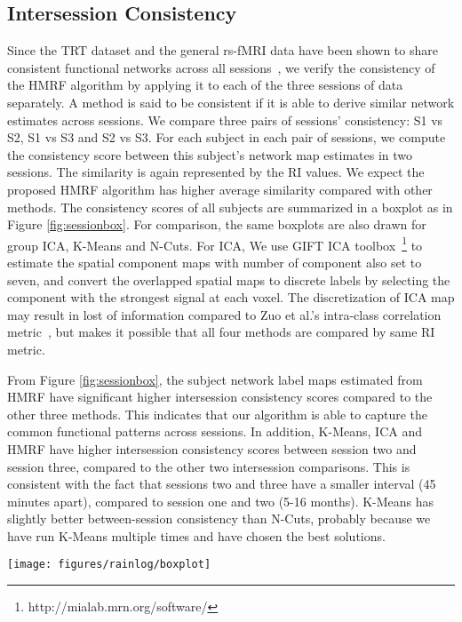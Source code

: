 \documentclass[review,authoryear]{elsarticle}
\begin{document}
\subsection{Intersession Consistency}
Since the TRT dataset and the general rs-fMRI data have been shown to share
consistent functional networks across all
sessions~\citep{damoiseaux2006consistent, chen2008group, meindl2010test,
  franco2009interrater}, we verify the consistency of the HMRF algorithm by
applying it to each of the three sessions of data separately.  A method is said
to be consistent if it is able to derive similar network estimates across
sessions.  We compare three pairs of sessions' consistency: S1 vs S2, S1 vs S3
and S2 vs S3. For each subject in each pair of sessions, we compute the
consistency score between this subject's network map estimates in two
sessions. The similarity is again represented by the RI values. We expect the
proposed HMRF algorithm has higher average similarity compared with other
methods. The consistency scores of all subjects are summarized in a boxplot as
in Figure \ref{fig:sessionbox}. For comparison, the same boxplots are also drawn
for group ICA, K-Means and N-Cuts. For ICA, We use GIFT ICA
toolbox~\footnote{http://mialab.mrn.org/software/} to estimate the spatial
component maps with number of component also set to seven, and convert the
overlapped spatial maps to discrete labels by selecting the component with the
strongest signal at each voxel. The discretization of ICA map may result in lost
of information compared to Zuo et al.'s intra-class correlation
metric~\citep{zuo2010reliable}, but makes it possible that all four methods are
compared by same RI metric.

From Figure \ref{fig:sessionbox}, the subject network label maps estimated from
HMRF have significant higher intersession consistency scores compared to the
other three methods. This indicates that our algorithm is able to capture the
common functional patterns across sessions. In addition, K-Means, ICA and HMRF
have higher intersession consistency scores between session two and session
three, compared to the other two intersession comparisons. This is consistent
with the fact that sessions two and three have a smaller interval (45 minutes
apart), compared to session one and two (5-16 months). K-Means has slightly
better between-session consistency than N-Cuts, probably because we have run
K-Means multiple times and have chosen the best solutions.

\begin{figure*}[htb]
  \centering
  \texttt{[image: figures/rainlog/boxplot]}
  \caption{Box-and-whiskers plots of the RI value between each pair of
    sessions over the all subjects' label map. The bottom and top of the boxes are
    the $25$th and $75$th percentile, and the whiskers extend to the whole
    range of the data except the outliers.}
  \label{fig:sessionbox}
\end{figure*}
\end{document}
